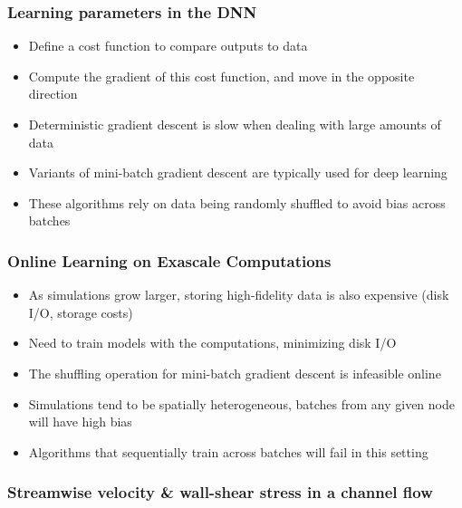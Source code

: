 \documentclass[aspectratio=169]{beamer}
\begin{document}
\begin{frame}
    \frametitle{Learning parameters in the DNN}
    \begin{itemize}
        \item Define a cost function to compare outputs to data
        \item Compute the gradient of this cost function, and move in the opposite direction
        \item Deterministic gradient descent is slow when dealing with large amounts of data
        \item Variants of mini-batch gradient descent are typically used for deep learning
        \item These algorithms rely on data being randomly shuffled to avoid bias across batches
    \end{itemize}
\end{frame}
\begin{frame}
    \frametitle{Online Learning on Exascale Computations}
    \begin{itemize}
        \item As simulations grow larger, storing high-fidelity data is also expensive (disk I/O, storage costs)
        \item Need to train models with the computations, minimizing disk I/O
        \item The shuffling operation for mini-batch gradient descent is infeasible online
        \item Simulations tend to be spatially heterogeneous, batches from any given node will have high bias
        \item Algorithms that sequentially train across batches will fail in this setting
    \end{itemize}
\end{frame}
\begin{frame}
  \frametitle{Streamwise velocity \& wall-shear stress in a channel flow}
  \vspace{6pt}
  \begin{figure}
    \centering
  \end{figure}
  \vspace{6pt}
\end{frame}
\end{document}
